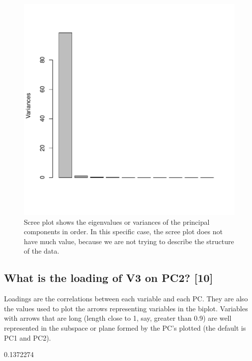 \documentclass[letterpaper]{article}
\begin{document}
\begin{figure}
\begin{center}
\includegraphics{HW05Key-figscreeplot}
\end{center}
\caption{Scree plot shows the eigenvalues or variances of the principal components in order. In this specific case, the scree plot does not have much value, because we are not trying to describe the structure of the data.}
\label{fig:qq}
\end{figure}

\subsection{What is the loading of V3 on PC2? [10]}

Loadings are the correlations between each variable and each PC. They are also the values used to plot the arrows representing variables in the biplot. Variables with arrows that are long (length close to 1, say, greater than 0.9) are well represented in the subspace or plane formed by the PC's plotted (the default is PC1 and PC2).

\begin{Schunk}
\begin{Soutput}
[1] 0.1372274
\end{Soutput}
\end{Schunk}
\end{document}
